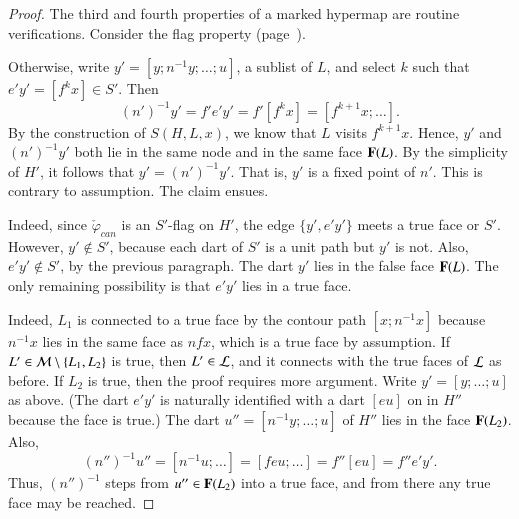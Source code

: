 \begin{proof}
The third and fourth properties of a marked hypermap are routine
verifications.  Consider the flag property (page~\pageref{def:flag}).

Otherwise, write $y' = [y;n^{-1}y;\ldots;u]$, a sublist of $L$, and
select $k$ such that $e'y' = [f^k x]\in S'$.  Then
\[ 
(n')^{-1} y' = f'e'y' = f'[f^k x] = [f^{k+1}x;\ldots].
\] 
By the construction of $S(H,L,x)$, we know that $L$ visits $f^{k+1}x$.
Hence, $y'$ and $(n')^{-1}y'$ both lie in the same node and in the same
face ${\mathbf F}(L)$.  By the simplicity of $H'$, it follows that $y' =
(n')^{-1} y'$.  That is, $y'$ is a fixed point of $n'$.  This is contrary to
assumption. The claim ensues.


  Indeed, since
$\check\varphi_{can}$ is an $S'$-flag on $H'$, the edge $\{y',e'y'\}$
meets a true face or $S'$.  However, $y'\not\in S'$, because each dart
of $S'$ is a unit path but $y'$ is not.  Also, $e'y'\not\in S'$, by
the previous paragraph.  The dart $y'$ lies in the false face ${\mathbf F}(L)$.
The only remaining possibility is that $e'y'$ lies in a true face.



   Indeed,
$L_1$ is connected to a true face by the contour path $[x;n^{-1} x]$
because $n^{-1} x$ lies in the same face as $n f x$, which is a true
face by assumption.  If $L'\in{\cal M}\setminus\{L_1,L_2\}$ is true,
then $L'\in {\cal L}$, and it connects with the true faces of ${\cal
  L}$ as before.  If $L_2$ is true, then the proof requires more
argument.  Write $y'=[y;\ldots;u]$ as above.  (The dart $e'y'$ is
naturally identified with a dart $[e u]$ on in $H''$ because the face
is true.)  The dart $u''=[n^{-1}y;\ldots;u]$ of $H''$ lies in the face
${\mathbf F}(L_2)$.  Also,
\[ 
(n'')^{-1} u''= [n^{-1} u;\ldots] = [f e u;\ldots] = f'' [ e u]
  = f'' e' y'.
\] 
Thus, $(n'')^{-1}$ steps from $u''\in {\mathbf F}(L_2)$ into a true face, and
from there any true face may be reached.


\end{proof}
